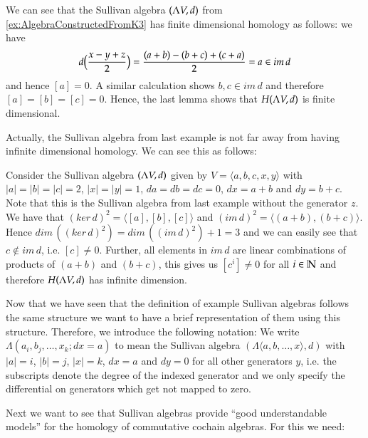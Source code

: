  \begin{Example}
 \label{ex:AlgebraConstructedFromK3HasFiniteHomology}
 We can see that the Sullivan algebra $(\Lambda V,d)$ from \ref{ex:AlgebraConstructedFromK3} has finite dimensional homology
 as follows: 
 we have 
 $$d \big{(} \frac{x - y + z}{2} \big{)} = \frac{(a + b) - (b + c) + (c + a)}{2} = a \in im \, d$$
 and hence $[a] = 0$. A similar calculation shows $b,c \in im \, d$ and therefore
 $[a] = [b] = [c] = 0$. Hence, the last lemma shows that $H (\Lambda V,d)$ is finite dimensional.
 \end{Example}

 Actually, the Sullivan algebra from last example is not far away from having infinite dimensional homology.
 We can see this as follows:
 
 \begin{Example}
 \label{ex:AlgebraFromK3WithoutOneEdge}
  Consider the Sullivan algebra $(\Lambda V,d)$ given by $V = \langle a,b,c , x,y \rangle$ with 
  $|a| = |b| = |c| = 2$, $|x| = |y| = 1$, $da = db = dc = 0$, $dx = a + b$ and $dy = b + c$.
  Note that this is the Sullivan algebra from last example without the generator $z$.
  We have that $(ker \, d)^2 = \langle [a], [b], [c] \rangle$ and 
  $(im \, d)^2 = \langle (a + b), (b +c) \rangle$. Hence $dim \, ( (ker \, d)^2 ) = dim \, ((im \, d)^2 )+ 1 = 3$ and 
  we can easily see that $c \notin im \,d$, i.e. $[c] \neq 0$. Further, all elements in $im \, d$ are 
  linear combinations of products of $( a + b)$ and $(b +c)$, this gives us $[c^i] \neq 0$ for all $i \in \mathbb{N}$
  and therefore $H (\Lambda V,d)$ has infinite dimension.
 \end{Example}

\begin{Remark}
 Now that we have seen that the definition of example Sullivan algebras follows the same structure
 we want to have a brief representation of them using this structure.
 Therefore, we introduce the following notation: \newline
 We write $\Lambda (a_i , b_j, \ldots, x_k ; d x = a)$ to mean the Sullivan algebra
 $(\Lambda \langle a, b, \ldots, x \rangle , d) $ with $|a| = i$, $|b| = j$, $|x| = k$, $d x = a$ and
 $dy = 0 $ for all other generators $y$, i.e. the subscripts denote the degree of the indexed generator and
 we only specify the differential on generators which get not mapped to zero.
\end{Remark}


Next we want to see that Sullivan algebras provide ``good understandable models'' for the homology of 
commutative cochain algebras. For this we need:

